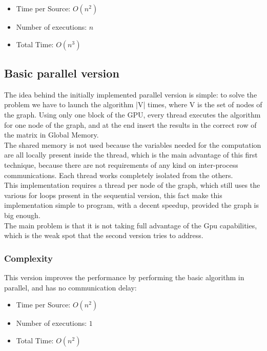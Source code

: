 \documentclass[
	a4paper, %
	12pt, %
]{class}
\begin{document}
\begin{itemize}
    \item Time per Source: $O(n^2)$
    \item Number of executions: $n$
    \item Total Time: $O(n^3)$\\
\end{itemize}

\subsection{Basic parallel version}
The idea behind the initially implemented parallel version is simple:
to solve the problem we have to launch the algorithm |V| times, where V is the set of nodes of the graph.
Using only one block of the GPU, every thread executes the algorithm for one node of the graph, and at the end insert the results in the correct
row of the matrix in Global Memory.\\

The shared memory is not used because the variables needed for the computation are all locally present inside the thread, which is the main advantage of
this first technique, because there are not requirements of any kind on inter-process communications. Each thread works completely isolated from the others.\\

This implementation requires a thread per node of the graph, which still uses the various for loops present in the sequential version,
this fact make this implementation simple to program, with a decent speedup, provided the graph is big enough.\\
The main problem is that it is not taking full advantage of the Gpu capabilities, which is the weak spot that the second version tries to address.

\subsubsection{Complexity}
This version improves the performance by performing the basic algorithm in parallel, and has no communication delay:\\
\begin{itemize}
    \item Time per Source: $O(n^2)$
    \item Number of executions: $1$
    \item Total Time: $O(n^2)$\\
\end{itemize}
\end{document}
